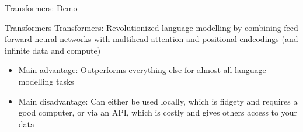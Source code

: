 \documentclass[10pt]{beamer}
\begin{document}
    \begin{frame}{Transformers: Demo}
        \centering
    \end{frame}

    \begin{frame}{Transformers}
        Transformers: Revolutionized language modelling by combining feed forward neural networks with multihead attention and positional endcodings (and infinite data and compute)
            \begin{itemize}
                \item Main advantage: Outperforms everything else for almost all language modelling tasks
                \item Main disadvantage: Can either be used locally, which is fidgety and requires a good computer, or via an API, which is costly and gives others access to your data
            \end{itemize}
    \end{frame}
\end{document}
